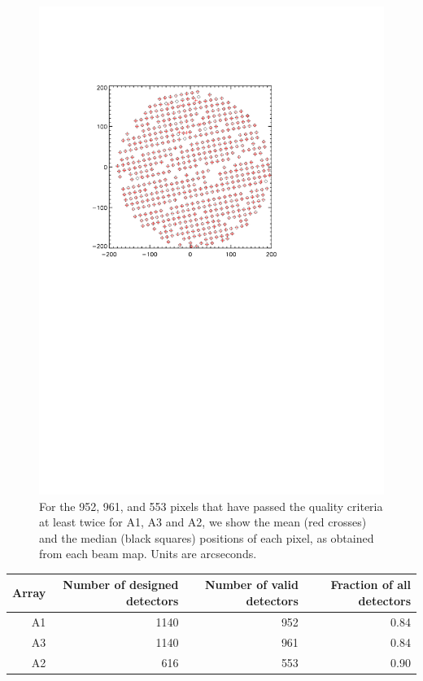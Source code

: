 \begin{figure}
\begin{center}
\includegraphics[trim=2cm 14cm 5cm 4cm, clip=true,width=0.6\linewidth]{Figures/A2_test_positions.pdf}
\caption{For the 952, 961, and 553 pixels that
  have passed the quality criteria at least twice for A1, A3 and A2,
  we show the mean (red crosses) and the median (black squares)
  positions of each pixel, as obtained from each beam map.
  Units are arcseconds. }
\label{fig:mean_vs_median}
\end{center}
\end{figure}


\begin{table}
  \label{tab:number_of_kids}
  \begin{tabular}{|r|r|r|r|}
    \hline
    Array & Number of designed detectors &  Number of valid detectors & Fraction of all detectors\\
    \hline
    A1 & 1140 & 952 &  0.84\\
    A3 & 1140 & 961 &  0.84\\
    A2 & 616  & 553 &  0.90\\
    \hline
  \end{tabular}
\end{table}
